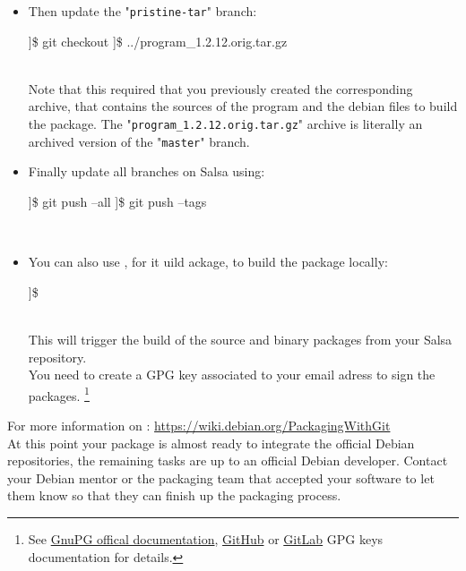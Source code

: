 \begin{itemize}
\item Then update the "\texttt{pristine-tar}" branch: 
\vspace{-0.25cm}
\begin{scripti}
]\$ git checkout 
]\$    ../program\_1.2.12.orig.tar.gz
\end{scripti}
\\[-0.75cm]
Note that this required that you previously created the corresponding archive, that contains the sources of the program and the debian files to build the package. 
The "\texttt{program\_1.2.12.orig.tar.gz}" archive is literally an archived version of the "\texttt{master}" branch. 
\item Finally update all branches on Salsa using: 
\vspace{-0.25cm}
\begin{scripti}
]\$ git push --all
]\$ git push --tags
\end{scripti}
\\[-1.0cm]
\item You can also use , for it uild ackage, to build the package locally:
\vspace{-0.25cm}
\begin{scripti}
]\$  
\end{scripti}
\\[-1.0cm]
\noindent This will trigger the build of the source and binary packages from your Salsa repository. \\
You need to create a GPG key associated to your email adress to sign the packages. \footnote{See \href{https://www.gnupg.org/documentation/index.html}{GnuPG offical documentation}, \href{https://docs.github.com/fr/authentication/managing-commit-signature-verification/generating-a-new-gpg-key}{GitHub} or \href{https://docs.gitlab.com/ee/user/project/repository/signed\_commits/gpg.html}{GitLab} GPG keys documentation for details.}
\end{itemize}
For more information on : \href{https://wiki.debian.org/PackagingWithGit}{https://wiki.debian.org/PackagingWithGit} \\[0.25cm]
At this point your package is almost ready to integrate the official Debian repositories, the remaining tasks are up to an official Debian developer. Contact your Debian mentor or the packaging team that accepted your software to let them know so that they can finish up the packaging process. \\[0.25cm]

